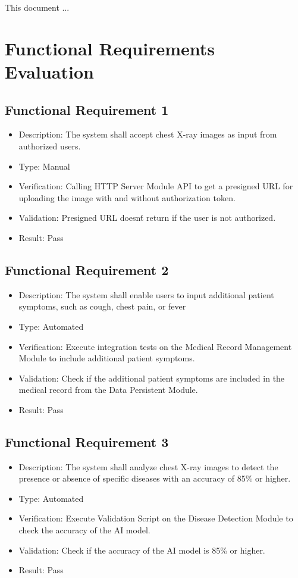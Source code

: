 \documentclass[12pt, titlepage]{article}
\begin{document}
\newpage


This document ...

\section{Functional Requirements Evaluation}
\subsection{Functional Requirement 1}
\begin{itemize}
  \item Description: The system shall accept chest X-ray images as input from authorized users.
  \item Type: Manual
  \item Verification: Calling HTTP Server Module API to get a presigned URL for uploading the image with and without authorization token.
  \item Validation: Presigned URL doesn\'t return if the user is not authorized.
  \item Result: Pass
\end{itemize}

\subsection{Functional Requirement 2}
\begin{itemize}
  \item Description: The system shall enable users to input additional patient symptoms, such as cough, chest pain, or fever
  \item Type: Automated
  \item Verification: Execute integration tests on the Medical Record Management Module to include additional patient symptoms.
  \item Validation: Check if the additional patient symptoms are included in the medical record from the Data Persistent Module.
  \item Result: Pass
\end{itemize}

\subsection{Functional Requirement 3}
\begin{itemize}  
  \item Description: The system shall analyze chest X-ray images to detect the presence or absence of specific diseases with an accuracy of 85\% or higher.
  \item Type: Automated
  \item Verification: Execute Validation Script on the Disease Detection Module to check the accuracy of the AI model.
  \item Validation: Check if the accuracy of the AI model is 85\% or higher.
  \item Result: Pass
\end{itemize}
\end{document}
